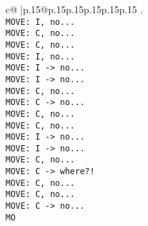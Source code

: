 \documentclass{article}
\begin{document}
{\begin{supertabular}{c@{$\;$}|p{.15\linewidth}@{}p{.15\linewidth}p{.15\linewidth}p{.15\linewidth}p{.15\linewidth}p{.15\linewidth}}
{{{.\\ \tt  MOVE: I, no...\\ \tt  MOVE: C, no...\\ \tt  MOVE: C, no...\\ \tt  MOVE: I, no...\\ \tt  MOVE: I -> no...\\ \tt  MOVE: I -> no...\\ \tt  MOVE: C, no...\\ \tt  MOVE: C -> no...\\ \tt  MOVE: C, no...\\ \tt  MOVE: C, no...\\ \tt  MOVE: I -> no...\\ \tt  MOVE: I -> no...\\ \tt  MOVE: C, no...\\ \tt  MOVE: C -> where?!\\ \tt  MOVE: C, no...\\ \tt  MOVE: C, no...\\ \tt  MOVE: C -> no...\\ \tt  MO}}}
\end{supertabular}}
\end{document}
